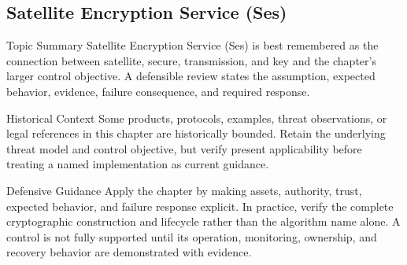 \documentclass[11pt,letterpaper]{article}
\begin{document}
\subsection*{Satellite Encryption Service (Ses)}
\begin{CornellNotesTable}
\end{CornellNotesTable}
\begin{CornellSummaryBox}{Topic Summary}
Satellite Encryption Service (Ses) is best remembered as the connection between satellite, secure, transmission, and key and the chapter's larger control objective. A defensible review states the assumption, expected behavior, evidence, failure consequence, and required response.
\end{CornellSummaryBox}
\begin{CornellWarningBox}{Historical Context}
Some products, protocols, examples, threat observations, or legal references in this chapter are historically bounded. Retain the underlying threat model and control objective, but verify present applicability before treating a named implementation as current guidance.
\end{CornellWarningBox}
\begin{CornellOverviewBox}{Defensive Guidance}
Apply the chapter by making assets, authority, trust, expected behavior, and failure response explicit. In practice, verify the complete cryptographic construction and lifecycle rather than the algorithm name alone. A control is not fully supported until its operation, monitoring, ownership, and recovery behavior are demonstrated with evidence.
\end{CornellOverviewBox}
\end{document}
